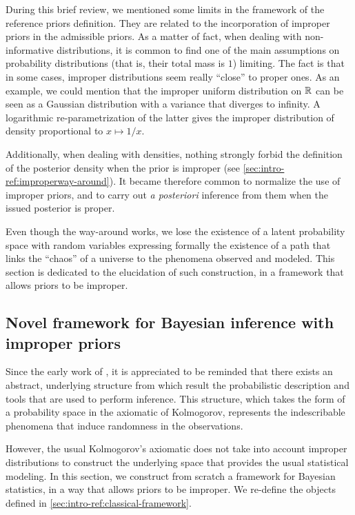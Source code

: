 During this brief review, we mentioned some limits in the framework of the reference priors definition.
They are related to the incorporation of improper priors in the admissible priors. As a matter of fact, when dealing with non-informative distributions, it is common to find one of the main assumptions on probability distributions (that is, their total mass is $1$) limiting.
The fact is that in some cases, improper distributions seem really ``close'' to proper ones.
As an example, we could mention that the improper uniform distribution on $\mathbb{R}$ can be seen as a Gaussian distribution with a variance that diverges to infinity. A logarithmic re-parametrization of the latter gives the improper distribution of density proportional to $x\mapsto1/x$.

Additionally, when dealing with densities, nothing strongly forbid the definition of the posterior density when the prior is improper (see \cref{sec:intro-ref:improperway-around}). It became therefore common to normalize the use of improper priors, and to carry out \emph{a posteriori} inference from them when the issued posterior is proper.

Even though the way-around works, we lose the existence of a latent probability space with random variables expressing formally the existence of a path that links the ``chaos'' of a universe to the phenomena observed and modeled.
This section is dedicated to the elucidation of such construction, in a framework that allows priors to be improper.



\subsection{Novel framework for Bayesian inference with improper priors}\label{sec:intro-ref:novelframework}



Since the early work of \citet{kolmogorov_foundations_1933}, it is appreciated to be reminded that there exists an abstract, underlying structure from which result the probabilistic description and tools that are used to perform inference. This structure, which takes the form of a probability space in the axiomatic of Kolmogorov, represents the indescribable phenomena that induce randomness in the observations.

However, the usual Kolmogorov's axiomatic does not take  into account improper distributions to construct the underlying space that provides the usual statistical modeling. 
In this section, we
construct from scratch a framework for Bayesian statistics, in a way that allows priors to be improper.
We re-define the objects defined in \cref{sec:intro-ref:classical-framework}.

